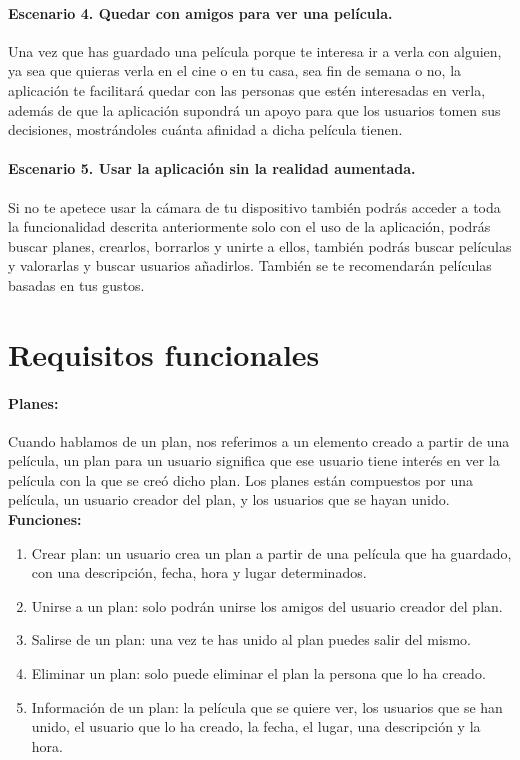 \paragraph{Escenario 4. Quedar con amigos para ver una película.}
\begin{flushleft}
    Una vez que has guardado una película porque te interesa ir a verla con alguien, ya sea que quieras verla en el cine o en tu casa, sea fin de semana o no, la aplicación te facilitará quedar 
    con las personas que estén interesadas en verla, además de que la aplicación supondrá un apoyo para que los usuarios tomen sus decisiones, mostrándoles cuánta afinidad a dicha película tienen.
\end{flushleft}

\paragraph{Escenario 5. Usar la aplicación sin la realidad aumentada.}
\begin{flushleft}
     Si no te apetece usar la cámara de tu dispositivo también podrás acceder a toda la funcionalidad descrita anteriormente solo con el uso de la aplicación, podrás buscar planes, crearlos, borrarlos y unirte a ellos, también podrás buscar películas y valorarlas y buscar usuarios añadirlos. También se te 
     recomendarán películas basadas en tus gustos.
\end{flushleft}

\section{Requisitos funcionales}
\label{makereference3.3}

\paragraph{\large Planes:\\}

Cuando hablamos de un plan, nos referimos a un elemento creado a partir de una película, un plan para un usuario significa que ese usuario tiene interés en ver la película con la que se creó dicho plan.
Los planes están compuestos por una película, un usuario creador del plan, y los usuarios que se hayan unido.
\\
\textbf{Funciones:}
\begin{enumerate}
    \item Crear plan: un usuario crea un plan a partir de una película que ha guardado, con una descripción, fecha, hora y lugar determinados.
    \item Unirse a un plan: solo podrán unirse los amigos del usuario creador del plan.
    \item Salirse de un plan: una vez te has unido al plan puedes salir del mismo.
    \item Eliminar un plan: solo puede eliminar el plan la persona que lo ha creado.
    \item Información de un plan: la película que se quiere ver, los usuarios que se han unido, el usuario que lo ha creado, la fecha, el lugar, una descripción y la hora.
\end{enumerate} 
